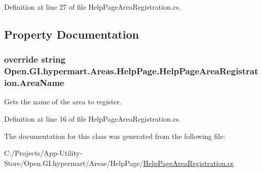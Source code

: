 Definition at line 27 of file Help\+Page\+Area\+Registration.\+cs.



\subsection{Property Documentation}
\hypertarget{class_open_1_1_g_i_1_1hypermart_1_1_areas_1_1_help_page_1_1_help_page_area_registration_a98b4d777a4852021b9a120b1eb5cd08a}{}
\subsubsection[{Area\+Name}]{\setlength{\rightskip}{0pt plus 5cm}override string Open.\+G\+I.\+hypermart.\+Areas.\+Help\+Page.\+Help\+Page\+Area\+Registration.\+Area\+Name\hspace{0.3cm}{\ttfamily [get]}}\label{class_open_1_1_g_i_1_1hypermart_1_1_areas_1_1_help_page_1_1_help_page_area_registration_a98b4d777a4852021b9a120b1eb5cd08a}


Gets the name of the area to register. 



Definition at line 16 of file Help\+Page\+Area\+Registration.\+cs.



The documentation for this class was generated from the following file\+:\begin{DoxyCompactItemize}
\item 
C\+:/\+Projects/\+App-\/\+Utility-\/\+Store/\+Open.\+G\+I.\+hypermart/\+Areas/\+Help\+Page/\hyperlink{_help_page_area_registration_8cs}{Help\+Page\+Area\+Registration.\+cs}\end{DoxyCompactItemize}
